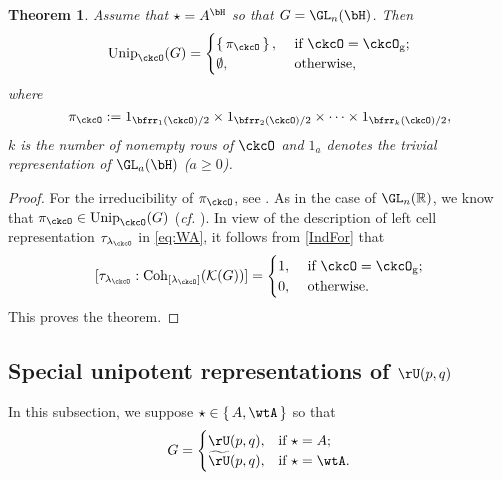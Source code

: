 \documentclass[12pt,a4paper]{amsart}
\def\abs#1{\left|{#1}\right|}
\newcommand{\CK}{{\mathcal {K}}}
\newcommand{\R}{\mathbb R}
\numberwithin{equation}{section}
\newtheorem{thm}{Theorem}[section]
\theoremstyle{remark}
\def\cf{\emph{cf.} }
\def\Unip{\mathrm{Unip}}
\def\lamck{\lambda_\ckcO}
\def\Cint#1{\Coh_{[#1]}}
\def\tU{\widetilde{\rU}}
\def\Coh{\mathrm{Coh}}
\begin{document}
\begin{thm}\label{thm:mainH}
  Assume that $\star=A^{\bH}$ so that $G = \GL_{n}(\bH)$. Then \[
\Unip_{\ckcO}(G)  = \begin{cases}
   \set{\pi_{\ckcO}},
    & \text{ if $\ckcO = \ckcO_{\mathrm g}$;}  \\
      \emptyset, & \text{ otherwise, } \\
    \end{cases}
  \]
where
  \[
    \pi_{\ckcO} := 1_{\bfrr_1(\ckcO)/2}\times 1_{\bfrr_2(\ckcO)/2} \times \cdots
   \times  1_{\bfrr_k(\ckcO)/2},
  \]
  $k$ is the number of nonempty rows of $\ckcO$
  and $1_{a}$ denotes the trivial representation of $\GL_{a}(\bH)$ ($a\geq 0$).

\end{thm}
\begin{proof} For the irreducibility of $\pi_{\ckcO}$, see \cite[Theorem 3.8]{V.GL}. As in the case of $\GL_n(\R)$, we know that $\pi_{\ckcO}\in \Unip_{\ckcO}(G)$ (\cf \cite[Lemma 8.3]{BVUni}).
In view of the description of left cell representation $\tau_{\lamck}$ in \eqref{eq:WA}, it follows from \eqref{IndFor} that
\[
[\tau_{\lamck}:\Cint{\lamck}(\CK(G))]  = \begin{cases}
   1,
    & \text{ if $\ckcO = \ckcO_{\mathrm g}$;}  \\
      0, & \text{ otherwise.} \\
    \end{cases}
  \]
This proves the theorem. %
\end{proof}



\subsection{Special unipotent representations of $\rU(p,q)$}

In this subsection, we suppose  $\star \in \set{A, \wtA}$ so that
\[
  G =
  \begin{cases}
    \rU(p,q),  & \text{if }\star = A;\\
    \tU(p,q),  & \text{if }\star = \wtA.
\end{cases}
\]
\end{document}
